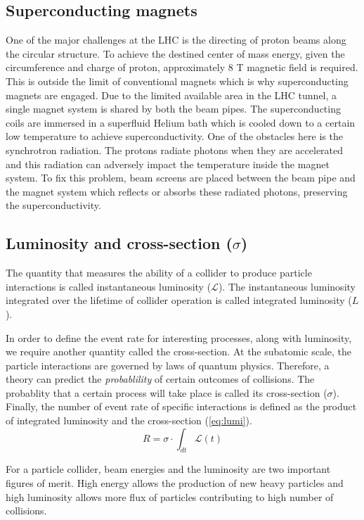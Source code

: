\subsection*{Superconducting magnets}
One of the major challenges at the LHC is the directing of proton beams along the circular structure. To achieve the destined center of mass energy, 
given the circumference and charge of proton, approximately 8 T magnetic field is required. This is outside the limit of conventional magnets which is why 
superconducting magnets are engaged. Due to the limited available area in the LHC tunnel, a single magnet system is shared by both the beam pipes. The 
superconducting coils are immersed in a superfluid Helium bath which is cooled down to a certain low temperature to achieve superconductivity. One of the 
obstacles here is the synchrotron radiation. The protons radiate photons when they are accelerated and this radiation can adversely impact the temperature 
inside the magnet system. To fix this problem, beam screens are placed between the beam pipe and the magnet system which reflects or absorbs these radiated photons,
preserving the superconductivity. 

\subsection*{Luminosity and cross-section ($\sigma$)}
The quantity that measures the ability of a collider to produce particle interactions is called
instantaneous luminosity ($\mathcal{L}$). The instantaneous luminosity integrated over the lifetime
of collider operation is called integrated luminosity ($L$).

In order to define the event rate for interesting processes, along with luminosity, we require
another quantity called the cross-section. At the subatomic scale, the particle interactions 
are governed by laws of quantum physics. Therefore, a theory can predict 
the \textit{probablility} of certain outcomes of collisions. The probablity that a certain
process will take place is called its cross-section ($\sigma$). Finally, the number of event rate of
specific interactions is defined as the product of integrated luminosity and the cross-section (\cref{eq:lumi}).
\begin{equation}
    R = \sigma \cdot \int_{dt} \mathcal{L}(t)
    \label{eq:lumi}
\end{equation}

For a particle collider, beam energies and the luminosity are two important figures of merit. 
High energy allows the production of new heavy particles and high luminosity allows more flux 
of particles contributing to high number of collisions. 

